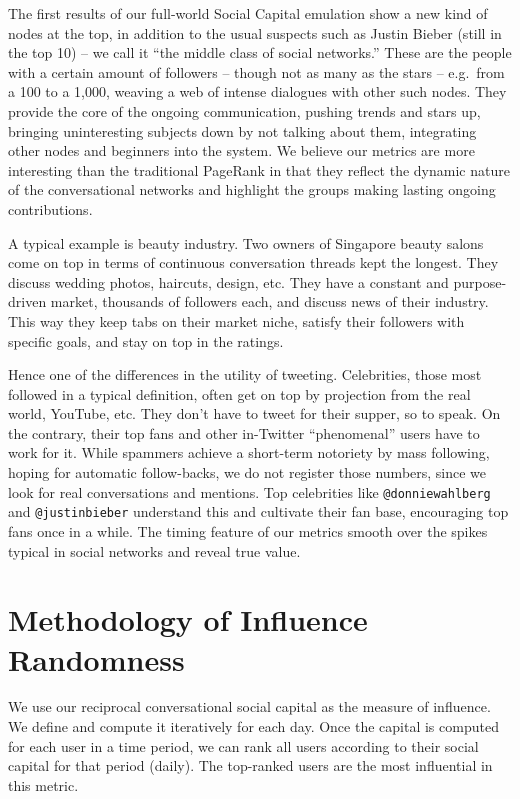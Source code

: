 \documentclass[10pt,oneside]{memoir}
\begin{document}
The first results of our full-world Social Capital emulation show a new kind of nodes at the top, in addition to the usual suspects such as Justin Bieber (still in the top 10) -- we call it ``the middle class of social networks.'' These are the people with a certain amount of followers -- though not as many as the stars -- e.g.\ from a 100 to a 1,000, weaving a web of intense dialogues with other such nodes. They provide the core of the ongoing communication, pushing trends and stars up, bringing uninteresting subjects down by not talking about them, integrating other nodes and beginners into the system. We believe our metrics are more interesting than the traditional PageRank in that they reflect the dynamic nature of the conversational networks and highlight the groups making lasting ongoing contributions.


A typical example is beauty industry. Two owners of Singapore beauty salons come on top in terms of continuous conversation threads kept the longest. They discuss wedding photos, haircuts, design, etc. They have a constant and purpose-driven market, thousands of followers each, and discuss news of their industry. This way they keep tabs on their market niche, satisfy their followers with specific goals, and stay on top in the ratings.


Hence one of the differences in the utility of tweeting. Celebrities, those most followed in a typical definition, often get on top by projection from the real world, YouTube, etc. They don't have to tweet for their supper, so to speak. On the contrary, their top fans and other in-Twitter ``phenomenal'' users have to work for it. While spammers achieve a short-term notoriety by mass following, hoping for automatic follow-backs, we do not register those numbers, since we look for real conversations and mentions. Top celebrities like \texttt{@donniewahlberg} and \texttt{@justinbieber} understand this and cultivate their fan base, encouraging top fans once in a while. The timing feature of our metrics smooth over the spikes typical in social networks and reveal true value.


\pagebreak \section{Methodology of Influence Randomness}
\label{methodologyofinfluencerandomness}

We use our reciprocal conversational social capital as the measure of influence.  We define and compute it iteratively for each day.  Once the capital is computed for each user in a time period,  we can rank all users according to their social capital for that period (daily).  The top-ranked users are the most influential in this metric.
\end{document}
